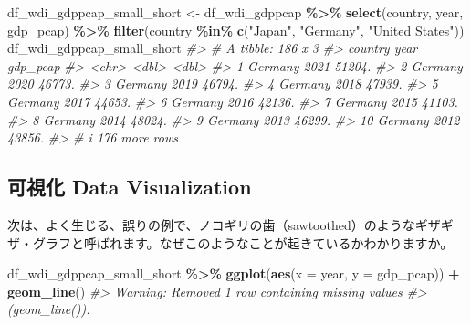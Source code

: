 \documentclass[
  xelatex, ja=standard]{bxjsbook}
\newenvironment{Shaded}{\begin{snugshade}}{\end{snugshade}}
\newcommand{\AttributeTok}[1]{\textcolor[rgb]{0.13,0.29,0.53}{#1}}
\newcommand{\CommentTok}[1]{\textcolor[rgb]{0.56,0.35,0.01}{\textit{#1}}}
\newcommand{\FunctionTok}[1]{\textcolor[rgb]{0.13,0.29,0.53}{\textbf{#1}}}
\newcommand{\NormalTok}[1]{#1}
\newcommand{\OtherTok}[1]{\textcolor[rgb]{0.56,0.35,0.01}{#1}}
\newcommand{\SpecialCharTok}[1]{\textcolor[rgb]{0.81,0.36,0.00}{\textbf{#1}}}
\newcommand{\StringTok}[1]{\textcolor[rgb]{0.31,0.60,0.02}{#1}}
\theoremstyle{definition}
\theoremstyle{definition}
\theoremstyle{definition}
\theoremstyle{definition}
\theoremstyle{remark}
\begin{document}
\begin{Shaded}
\begin{Highlighting}[]
\NormalTok{df\_wdi\_gdppcap\_small\_short }\OtherTok{\textless{}{-}}\NormalTok{ df\_wdi\_gdppcap }\SpecialCharTok{\%\textgreater{}\%} \FunctionTok{select}\NormalTok{(country, year, gdp\_pcap) }\SpecialCharTok{\%\textgreater{}\%}
  \FunctionTok{filter}\NormalTok{(country }\SpecialCharTok{\%in\%} \FunctionTok{c}\NormalTok{(}\StringTok{"Japan"}\NormalTok{, }\StringTok{"Germany"}\NormalTok{, }\StringTok{"United States"}\NormalTok{))}
\NormalTok{df\_wdi\_gdppcap\_small\_short}
\CommentTok{\#\textgreater{} \# A tibble: 186 x 3}
\CommentTok{\#\textgreater{}    country  year gdp\_pcap}
\CommentTok{\#\textgreater{}    \textless{}chr\textgreater{}   \textless{}dbl\textgreater{}    \textless{}dbl\textgreater{}}
\CommentTok{\#\textgreater{}  1 Germany  2021   51204.}
\CommentTok{\#\textgreater{}  2 Germany  2020   46773.}
\CommentTok{\#\textgreater{}  3 Germany  2019   46794.}
\CommentTok{\#\textgreater{}  4 Germany  2018   47939.}
\CommentTok{\#\textgreater{}  5 Germany  2017   44653.}
\CommentTok{\#\textgreater{}  6 Germany  2016   42136.}
\CommentTok{\#\textgreater{}  7 Germany  2015   41103.}
\CommentTok{\#\textgreater{}  8 Germany  2014   48024.}
\CommentTok{\#\textgreater{}  9 Germany  2013   46299.}
\CommentTok{\#\textgreater{} 10 Germany  2012   43856.}
\CommentTok{\#\textgreater{} \# i 176 more rows}
\end{Highlighting}
\end{Shaded}

\hypertarget{ux53efux8996ux5316-data-visualization}{%
\subsection{可視化 Data Visualization}\label{ux53efux8996ux5316-data-visualization}}

次は、よく生じる、誤りの例で、ノコギリの歯（sawtoothed）のようなギザギザ・グラフと呼ばれます。なぜこのようなことが起きているかわかりますか。

\begin{Shaded}
\begin{Highlighting}[]
\NormalTok{df\_wdi\_gdppcap\_small\_short }\SpecialCharTok{\%\textgreater{}\%}
  \FunctionTok{ggplot}\NormalTok{(}\FunctionTok{aes}\NormalTok{(}\AttributeTok{x =}\NormalTok{ year, }\AttributeTok{y =}\NormalTok{ gdp\_pcap)) }\SpecialCharTok{+} \FunctionTok{geom\_line}\NormalTok{()}
\CommentTok{\#\textgreater{} Warning: Removed 1 row containing missing values}
\CommentTok{\#\textgreater{} (\textasciigrave{}geom\_line()\textasciigrave{}).}
\end{Highlighting}
\end{Shaded}
\end{document}
